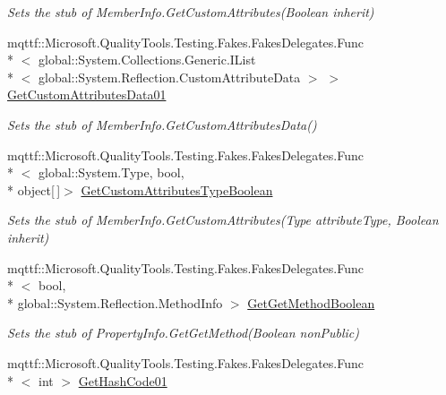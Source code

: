 \begin{DoxyCompactItemize}
\begin{DoxyCompactList}\small\item\em Sets the stub of Member\-Info.\-Get\-Custom\-Attributes(\-Boolean inherit)\end{DoxyCompactList}\item 
mqttf\-::\-Microsoft.\-Quality\-Tools.\-Testing.\-Fakes.\-Fakes\-Delegates.\-Func\\*
$<$ global\-::\-System.\-Collections.\-Generic.\-I\-List\\*
$<$ global\-::\-System.\-Reflection.\-Custom\-Attribute\-Data $>$ $>$ \hyperlink{class_system_1_1_reflection_1_1_fakes_1_1_stub_property_info_a132e615b5abd8c9e23b8499a25e6586f}{Get\-Custom\-Attributes\-Data01}
\begin{DoxyCompactList}\small\item\em Sets the stub of Member\-Info.\-Get\-Custom\-Attributes\-Data()\end{DoxyCompactList}\item 
mqttf\-::\-Microsoft.\-Quality\-Tools.\-Testing.\-Fakes.\-Fakes\-Delegates.\-Func\\*
$<$ global\-::\-System.\-Type, bool, \\*
object\mbox{[}$\,$\mbox{]}$>$ \hyperlink{class_system_1_1_reflection_1_1_fakes_1_1_stub_property_info_ad467c72feec76507fb493ac4587cad39}{Get\-Custom\-Attributes\-Type\-Boolean}
\begin{DoxyCompactList}\small\item\em Sets the stub of Member\-Info.\-Get\-Custom\-Attributes(\-Type attribute\-Type, Boolean inherit)\end{DoxyCompactList}\item 
mqttf\-::\-Microsoft.\-Quality\-Tools.\-Testing.\-Fakes.\-Fakes\-Delegates.\-Func\\*
$<$ bool, \\*
global\-::\-System.\-Reflection.\-Method\-Info $>$ \hyperlink{class_system_1_1_reflection_1_1_fakes_1_1_stub_property_info_a2568efd32b4173d8d2df061f9b6b7e7d}{Get\-Get\-Method\-Boolean}
\begin{DoxyCompactList}\small\item\em Sets the stub of Property\-Info.\-Get\-Get\-Method(\-Boolean non\-Public)\end{DoxyCompactList}\item 
mqttf\-::\-Microsoft.\-Quality\-Tools.\-Testing.\-Fakes.\-Fakes\-Delegates.\-Func\\*
$<$ int $>$ \hyperlink{class_system_1_1_reflection_1_1_fakes_1_1_stub_property_info_abceb4de56ce5d74fdf9c32bec6894b0b}{Get\-Hash\-Code01}

\end{DoxyCompactItemize}
